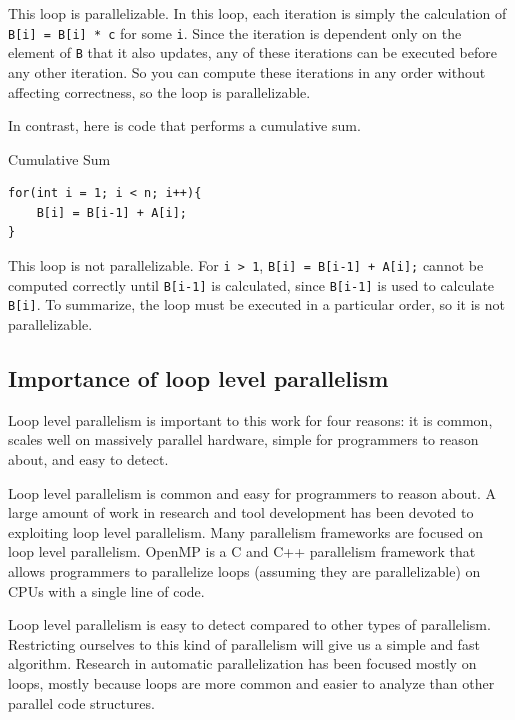\documentclass[12pt,twoside]{reedthesis}
\newenvironment{codeexample}[1][htb]
{\floatname{algorithm}{Code Example}%
	\begin{algorithm}[#1]%
	}{\end{algorithm}}
\begin{document}
		This loop is parallelizable. In this loop, each iteration is simply the calculation of \texttt{B[i] = B[i] * c} for some \texttt{i}. Since the iteration is dependent only on the element of \texttt{B} that it also updates, any of these iterations can be executed before any other iteration. So you can compute these iterations in any order without affecting correctness, so the loop is parallelizable. 
		
		In contrast, here is code that performs a cumulative sum. 
		
		\begin{codeexample}
			\caption{Cumulative Sum}\label{cum-sum}
		\begin{lstlisting}
for(int i = 1; i < n; i++){
	B[i] = B[i-1] + A[i];
}
		\end{lstlisting}
		\end{codeexample}
		
		This loop is not parallelizable. For \texttt{i > 1}, \texttt{B[i] = B[i-1] + A[i];} cannot be computed correctly until \texttt{B[i-1]} is calculated, since \texttt{B[i-1]} is used to calculate \texttt{B[i]}. To summarize, the loop must be executed in a particular order, so it is not parallelizable. 
		
		\subsection{Importance of loop level parallelism}
		
		Loop level parallelism is important to this work for four reasons: it is common, scales well on massively parallel hardware, simple for programmers to reason about, and easy to detect. 
		
		Loop level parallelism is common and easy for programmers to reason about. 
		A large amount of work in research and tool development has been devoted to exploiting loop level parallelism. Many parallelism frameworks are focused on loop level parallelism. OpenMP is a C and C++ parallelism framework that allows programmers to parallelize loops (assuming they are parallelizable) on CPUs with a single line of code. 
		
		Loop level parallelism is easy to detect compared to other types of parallelism. Restricting ourselves to this kind of parallelism will give us a simple and fast algorithm.
		Research in automatic parallelization has been focused mostly on loops, mostly because loops are more common and easier to analyze than other parallel code structures. 
		
\end{document}
